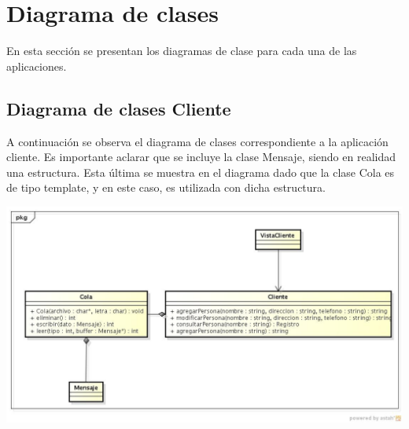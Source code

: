 \documentclass[11pt]{article}
\begin{document}
  \newline









\newpage

\section{Diagrama de clases}
 En esta secci\'on se presentan los diagramas de clase para cada una de las aplicaciones.
\subsection{Diagrama de clases Cliente}
A continuaci\'on se observa el diagrama de clases correspondiente a la aplicaci\'on cliente. Es importante aclarar que se incluye la clase Mensaje, 
siendo en realidad una estructura. Esta última se muestra en el diagrama dado que la clase Cola es de tipo template, y en este caso, es utilizada 
con dicha estructura. 
\begin{center}
\includegraphics[scale=0.45,width=1.02\textwidth]{ClasesCliente} 
\end{center}
\end{document}
